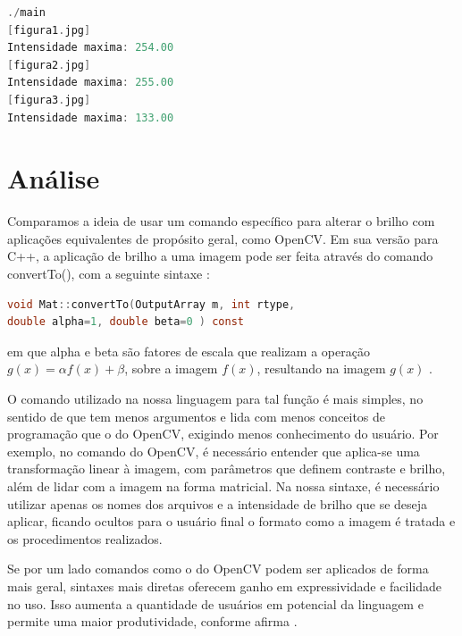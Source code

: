 \documentclass[a4paper, 10pt, conference]{ieeeconf}
\begin{document}
\begin{lstlisting}[language=C, basicstyle=\footnotesize, frame=single]
./main
[figura1.jpg]
Intensidade maxima: 254.00
[figura2.jpg]
Intensidade maxima: 255.00
[figura3.jpg]
Intensidade maxima: 133.00
\end{lstlisting}

\section{Análise}


Comparamos a ideia de usar um comando específico para alterar o brilho com aplicações equivalentes de propósito geral, como OpenCV. Em sua versão para C++, a aplicação de brilho a uma imagem pode ser feita através do comando convertTo(), com a seguinte sintaxe \cite{opencv2}:
\begin{lstlisting}[language=C, basicstyle=\footnotesize]
void Mat::convertTo(OutputArray m, int rtype, 
double alpha=1, double beta=0 ) const
\end{lstlisting}
em que alpha e beta são fatores de escala que realizam a operação $g(x)=\alpha f(x) + \beta$, sobre a imagem $f(x)$, resultando na imagem $g(x)$ \cite{opencv}.

O comando utilizado na nossa linguagem para tal função é mais simples, no sentido de que tem menos argumentos e lida com menos conceitos de programação que o do OpenCV, exigindo menos conhecimento do usuário. Por exemplo, no comando do OpenCV, é necessário entender que aplica-se uma transformação linear à imagem, com parâmetros que definem contraste e brilho, além de lidar com a imagem na forma matricial. Na nossa sintaxe, é necessário utilizar apenas os nomes dos arquivos e a intensidade de brilho que se deseja aplicar, ficando ocultos para o usuário final o formato como a imagem é tratada e os procedimentos realizados.

Se por um lado comandos como o do OpenCV podem ser aplicados de forma mais geral, sintaxes mais diretas oferecem ganho em expressividade e facilidade no uso. Isso aumenta a quantidade de usuários em potencial da linguagem e permite uma maior produtividade, conforme afirma \cite{dsl}.
\end{document}
